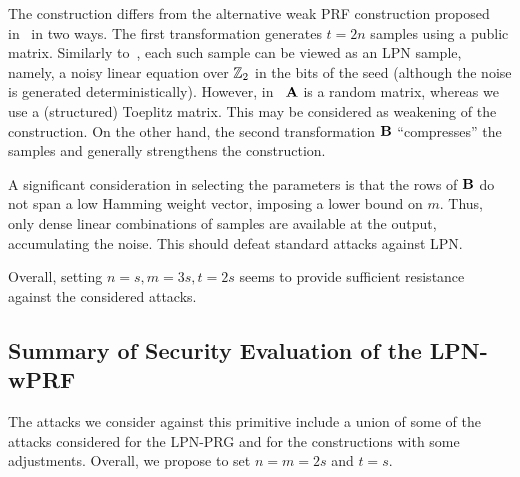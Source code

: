 The construction differs from
the alternative weak PRF construction proposed
in~\cite{boneh2018-darkmatter} in two ways.
The first transformation generates $t = 2n$ samples using a public matrix.
Similarly to~\cite{boneh2018-darkmatter},
each such sample can be viewed as an LPN sample, namely,
a noisy linear equation over $\mathbb{Z}_2$ in the bits of the seed
(although the noise is generated deterministically).
However, in~\cite{boneh2018-darkmatter} $\mat{A}$ is a random matrix,
whereas we use a (structured) Toeplitz matrix.
This may be considered as weakening of the construction.
On the other hand, the second transformation $\mat{B}$ ``compresses''
the samples and generally strengthens the construction.

A significant consideration in selecting the parameters is that
the rows of $\mat{B}$ do not span a low Hamming weight vector,
imposing a lower bound on $m$.
Thus, only dense linear combinations of samples are available at the output,
accumulating the noise. This should defeat standard attacks against LPN.

Overall, setting
$n=s, m = 3s, t = 2s$ seems to provide sufficient
resistance against the considered attacks.



\subsection{Summary of Security Evaluation of the LPN-wPRF}

The attacks we consider against this primitive include a union of some
of the attacks considered for the LPN-PRG and for the \ttwPRF constructions
with some adjustments. Overall, we propose to set $n=m= 2s$ and $t =s$.
